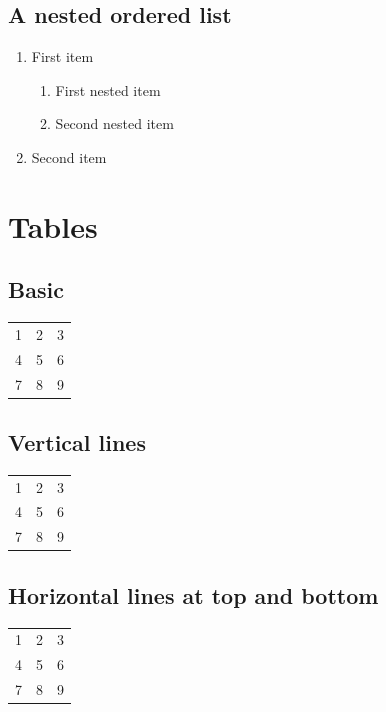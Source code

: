 \documentclass{article}
\begin{document}
  \subsection{A nested ordered list}
  \begin{enumerate}
    \item First item
    \begin{enumerate}
      \item First nested item
      \item Second nested item
    \end{enumerate}
    \item Second item
  \end{enumerate}

  \section{Tables}

  \subsection{Basic}

  \begin{tabular}{ l c r }
    1 & 2 & 3 \\
    4 & 5 & 6 \\
    7 & 8 & 9 \\
  \end{tabular}

  \subsection{Vertical lines}

  \begin{tabular}{ l | c | r }
    1 & 2 & 3 \\
    4 & 5 & 6 \\
    7 & 8 & 9 \\
  \end{tabular}

  \subsection{Horizontal lines at top and bottom}

  \begin{tabular}{ l | c | r }
    \hline
    1 & 2 & 3 \\
    4 & 5 & 6 \\
    7 & 8 & 9 \\
    \hline
  \end{tabular}
\end{document}

